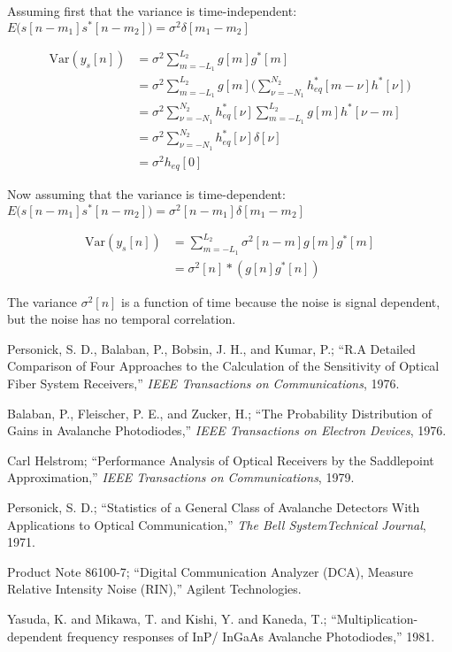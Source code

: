\documentclass[a4paper]{article}
\begin{document}
Assuming first that the variance is time-independent: $E\Big(s[n-m_1]s^*[n-m_2]\Big) = \sigma^2\delta[m_1-m_2]$

\begin{align}
\text{Var}(y_s[n]) & = \sigma^2\sum_{m=-L_1}^{L_2} g[m]g^*[m] \\
& = \sigma^2\sum_{m=-L_1}^{L_2} g[m]\bigg(\sum_{\nu= -N_1}^{N_2} h^*_{eq}[m-\nu]h^*[\nu]\bigg) \\
& = \sigma^2\sum_{\nu= -N_1}^{N_2} h^*_{eq}[\nu] \sum_{m=-L_1}^{L_2} g[m]h^*[\nu-m] \\
& = \sigma^2\sum_{\nu= -N_1}^{N_2} h^*_{eq}[\nu]\delta[\nu] \\
& = \sigma^2h_{eq}[0]
\end{align}

Now assuming that the variance is time-dependent: $E\Big(s[n-m_1]s^*[n-m_2]\Big) = \sigma^2[n-m_1]\delta[m_1-m_2]$

\begin{align}
\text{Var}(y_s[n]) & = \sum_{m=-L_1}^{L_2} \sigma^2[n-m]g[m]g^*[m] \\
& = \sigma^2[n]\ast (g[n]g^*[n])
\end{align}

The variance $\sigma^2[n]$ is a function of time because the noise is signal dependent, but the noise has no temporal correlation.

\begin{thebibliography}{9}
 Personick, S. D., Balaban, P., Bobsin, J. H., and Kumar, P.; ``R.A Detailed Comparison of Four Approaches to the Calculation of the Sensitivity of Optical Fiber System Receivers,'' \emph{IEEE Transactions on Communications}, 1976.

 Balaban, P., Fleischer, P. E., and Zucker, H.; ``The Probability Distribution of Gains in Avalanche Photodiodes,'' \emph{IEEE Transactions on Electron Devices}, 1976.

 Carl Helstrom; ``Performance Analysis of Optical Receivers by the Saddlepoint Approximation,'' \emph{IEEE Transactions on Communications}, 1979.

 Personick, S. D.; ``Statistics of a General Class of Avalanche Detectors With Applications to Optical Communication,'' \emph{The Bell SystemTechnical Journal}, 1971.

 Product Note 86100-7; ``Digital Communication Analyzer (DCA), Measure Relative Intensity Noise (RIN),'' Agilent Technologies. 

 Yasuda, K. and Mikawa, T. and Kishi, Y. and Kaneda, T.; ``Multiplication-dependent frequency responses of InP/ InGaAs Avalanche Photodiodes,'' 1981.



\end{thebibliography}
\end{document}
